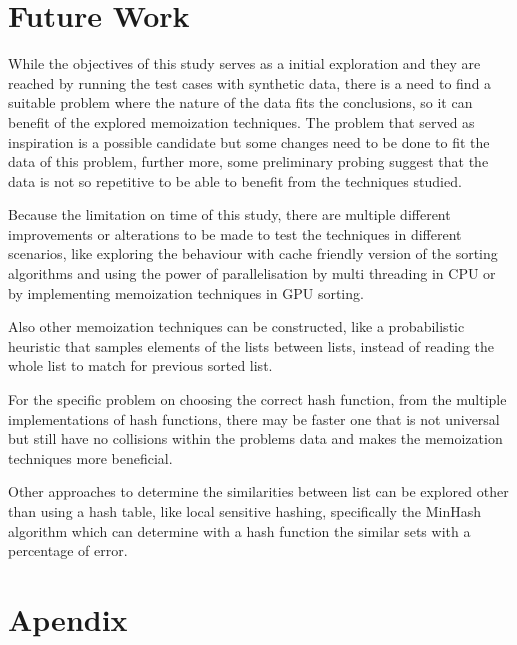 \documentclass[a4paper,12pt]{article}
\begin{document}
\section{Future Work}

While the objectives of this study serves as a initial exploration and they are reached by running the test cases with synthetic data, there is a need to find a suitable problem where the nature of the data fits the conclusions, so it can benefit of  the explored memoization techniques. The problem that served as inspiration \cite{Arch2015} is a possible candidate but some changes need to be done to fit the data of this problem, further more, some preliminary probing suggest that the data is not so repetitive to be able to benefit from the techniques studied.

Because the limitation on time of this study, there are multiple different improvements or alterations to be made to test the techniques in different scenarios, like exploring the behaviour with cache friendly version of the sorting algorithms and using the power of parallelisation by multi threading in CPU or by implementing memoization techniques in GPU sorting.

Also other memoization techniques can be constructed, like a probabilistic heuristic that samples elements of the lists between lists, instead of reading the whole list to match for previous sorted list.

For the specific problem on choosing the correct hash function, from the multiple implementations of hash functions, there may be faster one that is not universal but still have no collisions within the problems data and makes the memoization techniques more beneficial.

Other approaches to determine the similarities between list can be explored other than using a hash table, like local sensitive hashing, specifically the MinHash algorithm which can determine with a hash function the similar sets with a percentage of error.





\section{Apendix}
\end{document}
